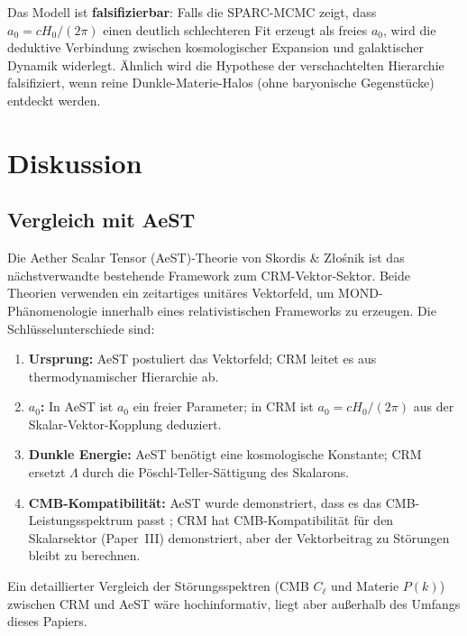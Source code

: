 \documentclass[aps,prd,twocolumn,superscriptaddress,nofootinbib]{revtex4-2}
\begin{document}
Das Modell ist \textbf{falsifizierbar}: Falls die SPARC-MCMC zeigt, dass $a_0 = cH_0/(2\pi)$ einen deutlich schlechteren Fit erzeugt als freies $a_0$, wird die deduktive Verbindung zwischen kosmologischer Expansion und galaktischer Dynamik widerlegt. \"Ahnlich wird die Hypothese der verschachtelten Hierarchie falsifiziert, wenn reine Dunkle-Materie-Halos (ohne baryonische Gegenst\"ucke) entdeckt werden.


\section{Diskussion}
\label{sec:discussion}

\subsection{Vergleich mit AeST}

Die Aether Scalar Tensor (AeST)-Theorie von Skordis \& Z{\l}o\'snik \cite{Skordis2021} ist das n\"achstverwandte bestehende Framework zum CRM-Vektor-Sektor. Beide Theorien verwenden ein zeitartiges unit\"ares Vektorfeld, um MOND-Ph\"anomenologie innerhalb eines relativistischen Frameworks zu erzeugen. Die Schl\"usselunterschiede sind:

\begin{enumerate}
\item \textbf{Ursprung:} AeST postuliert das Vektorfeld; CRM leitet es aus thermodynamischer Hierarchie ab.
\item \textbf{$a_0$:} In AeST ist $a_0$ ein freier Parameter; in CRM ist $a_0 = cH_0/(2\pi)$ aus der Skalar-Vektor-Kopplung deduziert.
\item \textbf{Dunkle Energie:} AeST ben\"otigt eine kosmologische Konstante; CRM ersetzt $\Lambda$ durch die P\"oschl-Teller-S\"attigung des Skalarons.
\item \textbf{CMB-Kompatibilit\"at:} AeST wurde demonstriert, dass es das CMB-Leistungsspektrum passt \cite{Skordis2021}; CRM hat CMB-Kompatibilit\"at f\"ur den Skalarsektor (Paper~III) demonstriert, aber der Vektorbeitrag zu St\"orungen bleibt zu berechnen.
\end{enumerate}

Ein detaillierter Vergleich der St\"orungsspektren (CMB $C_\ell$ und Materie $P(k)$) zwischen CRM und AeST w\"are hochinformativ, liegt aber au\ss{}erhalb des Umfangs dieses Papiers.
\end{document}
